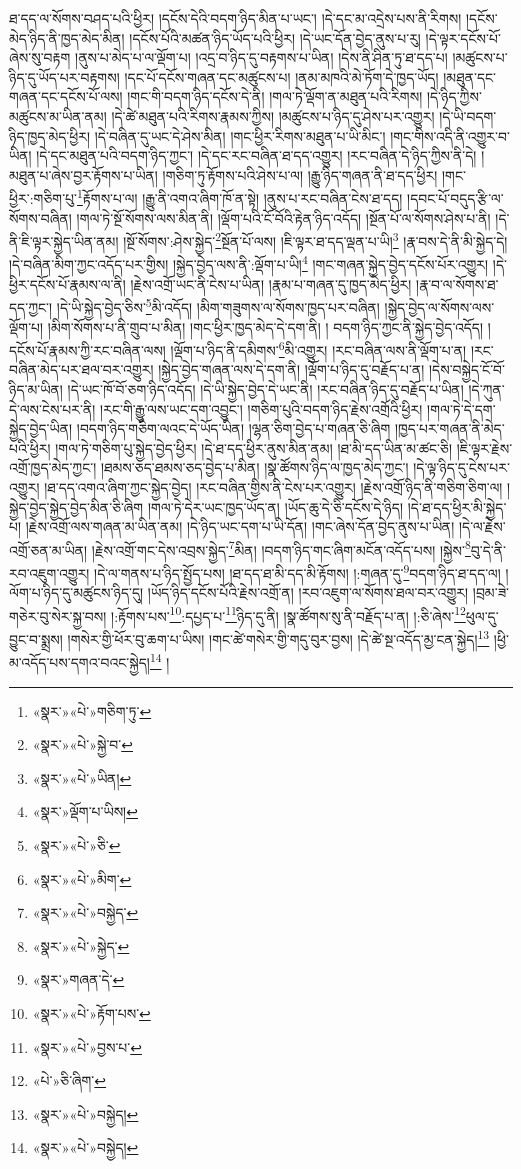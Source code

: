 ཐ་དད་ལ་སོགས་བཤད་པའི་ཕྱིར། །དངོས་དེའི་བདག་ཉིད་མིན་པ་ཡང་། །དེ་དང་མ་འདྲེས་པས་ནི་རིགས། །དངོས་མེད་ཉིད་ནི་ཁྱད་མེད་མིན། །དངོས་པོའི་མཚན་ཉིད་ཡོད་པའི་ཕྱིར། །དེ་ཡང་དོན་བྱེད་ནུས་པ་རུ། །དེ་ལྟར་དངོས་པོ་ཞེས་སུ་བརྟག །ནུས་པ་མེད་པ་ལ་ལྡོག་པ། །འདྲ་བ་ཉིད་དུ་བརྟགས་པ་ཡིན། །དེས་ནི་ཤིན་ཏུ་ཐ་དད་པ། །མཚུངས་པ་ཉིད་དུ་ཡོད་པར་བརྟགས། །དང་པོ་དངོས་གཞན་དང་མཚུངས་པ། །ནམ་མཁའི་མེ་ཏོག་དེ་ཁྱད་ཡོད། །མཐུན་དང་གཞན་དང་དངོས་པོ་ལས། །གང་གི་བདག་ཉིད་དངོས་དེ་ནི། །གལ་ཏེ་ལྡོག་ན་མཐུན་པའི་རིགས། །དེ་ཉིད་ཀྱིས་མཚུངས་མ་ཡིན་ནམ། །དེ་ཚེ་མཐུན་པའི་རིགས་རྣམས་ཀྱིས། །མཚུངས་པ་ཉིད་དུ་ཤེས་པར་འགྱུར། །དེ་ཡི་བདག་ཉིད་ཁྱད་མེད་ཕྱིར། །དེ་བཞིན་དུ་ཡང་དེ་ཤེས་མིན། །གང་ཕྱིར་རིགས་མཐུན་པ་ཡི་མིང་། །གང་གིས་འདི་ནི་འགྱུར་བ་ཡིན། །དེ་དང་མཐུན་པའི་བདག་ཉིད་ཀྱང་། །དེ་དང་རང་བཞིན་ཐ་དད་འགྱུར། །རང་བཞིན་དེ་ཉིད་ཀྱིས་ནི་དེ། །མཐུན་པ་ཞེས་བྱར་རྟོགས་པ་ཡིན། །གཅིག་ཏུ་རྟོགས་པའི་ཤེས་པ་ལ། །རྒྱུ་ཉིད་གཞན་ནི་ཐ་དད་ཕྱིར། །གང་ཕྱིར་:གཅིག་པུ་\footnote{«སྣར་»«པེ་»གཅིག་ཏུ་}རྟོགས་པ་ལ། །རྒྱུ་ནི་འགའ་ཞིག་ཁོ་ན་སྟེ། །ནུས་པ་རང་བཞིན་ངེས་ཐ་དད། །དབང་པོ་བདུད་རྩི་ལ་སོགས་བཞིན། །གལ་ཏེ་སྔོ་སོགས་ལས་མིན་ནི། །ལྡོག་པའི་ངོ་བོའི་རྟེན་ཉིད་འདོད། །སྔོན་པོ་ལ་སོགས་ཤེས་པ་ནི། །དེ་ནི་ཇི་ལྟར་སྐྱེད་ཡིན་ནམ། །སྔོ་སོགས་:ཤེས་སྐྱེད་\footnote{«སྣར་»«པེ་»སྐྱེ་བ་}སྔོན་པོ་ལས། །ཇི་ལྟར་ཐ་དད་ལྡན་པ་ཡི།\footnote{«སྣར་»«པེ་»ཡིན།} །རྣ་བས་དེ་ནི་མི་སྐྱེད་དེ། །དེ་བཞིན་མིག་ཀྱང་འདོད་པར་གྱིས། །སྐྱེད་བྱེད་ལས་ནི་:ལྡོག་པ་ཡི།\footnote{«སྣར་»ལྡོག་པ་ཡིས།} །གང་གཞན་སྐྱེད་བྱེད་དངོས་པོར་འགྱུར། །དེ་ཕྱིར་དངོས་པོ་རྣམས་ལ་ནི། །རྗེས་འགྲོ་ཡང་ནི་ངེས་པ་ཡིན། །རྣམ་པ་གཞན་དུ་ཁྱད་མེད་ཕྱིར། །རྣ་བ་ལ་སོགས་ཐ་དད་ཀྱང་། །དེ་ཡི་སྐྱེད་བྱེད་ཅིས་\footnote{«སྣར་»«པེ་»ཅི་}མི་འདོད། །མིག་གཟུགས་ལ་སོགས་ཁྱད་པར་བཞིན། །སྐྱེད་བྱེད་ལ་སོགས་ལས་ལྡོག་པ། །མིག་སོགས་པ་ནི་གྲུབ་པ་མིན། །གང་ཕྱིར་ཁྱད་མེད་དེ་དག་ནི། །
བདག་ཉིད་ཀྱང་ནི་སྐྱེད་བྱེད་འདོད། །དངོས་པོ་རྣམས་ཀྱི་རང་བཞིན་ལས། །ལྡོག་པ་ཉིད་ནི་དམིགས་\footnote{«སྣར་»«པེ་»མིག་}མི་འགྱུར། །རང་བཞིན་ལས་ནི་ལྡོག་པ་ན། །རང་བཞིན་མེད་པར་ཐལ་བར་འགྱུར། །སྐྱེད་བྱེད་གཞན་ལས་དེ་དག་ནི། །ལྡོག་པ་ཉིད་དུ་བརྗོད་པ་ན། །དེས་བསྐྱེད་ངོ་བོ་ཉིད་མ་ཡིན། །དེ་ཡང་ཁོ་བོ་ཅག་ཉིད་འདོད། །དེ་ཡི་སྐྱེད་བྱེད་དེ་ཡང་ནི། །རང་བཞིན་ཉིད་དུ་བརྗོད་པ་ཡིན། །དེ་ཀུན་དེ་ལས་ངེས་པར་ནི། །རང་གི་རྒྱུ་ལས་ཡང་དག་འབྱུང་། །གཅིག་པུའི་བདག་ཉིད་རྗེས་འགྲོའི་ཕྱིར། །གལ་ཏེ་དེ་དག་སྐྱེད་བྱེད་ཡིན། །བདག་ཉིད་གཅིག་ལའང་དེ་ཡོད་ཡིན། །ལྷན་ཅིག་བྱེད་པ་གཞན་ཅི་ཞིག །ཁྱད་པར་གཞན་ནི་མེད་པའི་ཕྱིར། །གལ་ཏེ་གཅིག་པུ་སྐྱེད་བྱེད་ཕྱིར། །དེ་ཐ་དད་ཕྱིར་ནུས་མིན་ནམ། །ཐ་མི་དད་ཡིན་མ་ཚང་ཅི། །ཇི་ལྟར་རྗེས་འགྲོ་ཁྱད་མེད་ཀྱང་། །ཐམས་ཅད་ཐམས་ཅད་བྱེད་པ་མིན། །སྣ་ཚོགས་ཉིད་ལ་ཁྱད་མེད་ཀྱང་། །དེ་ལྟ་ཉིད་དུ་ངེས་པར་འགྱུར། །ཐ་དད་འགའ་ཞིག་ཀྱང་སྐྱེད་བྱེད། །རང་བཞིན་གྱིས་ནི་ངེས་པར་འགྱུར། །རྗེས་འགྲོ་ཉིད་ནི་གཅིག་ཅིག་ལ། །སྐྱེད་བྱེད་སྐྱེད་བྱེད་མིན་ཅི་ཞིག །གལ་ཏེ་དེར་ཡང་ཁྱད་ཡོད་ན། །ཡོད་ཆུ་དེ་ཅི་དངོས་དེ་ཉིད། །དེ་ཐ་དད་ཕྱིར་མི་སྐྱེད་པ། །རྗེས་འགྲོ་ལས་གཞན་མ་ཡིན་ནམ། །དེ་ཉིད་ཡང་དག་པ་ཡི་དོན། །གང་ཞེས་དོན་བྱེད་ནུས་པ་ཡིན། །དེ་ལ་རྗེས་འགྲོ་ཅན་མ་ཡིན། །རྗེས་འགྲོ་གང་དེས་འབྲས་སྐྱེད་\footnote{«སྣར་»«པེ་»བསྐྱེད་}མིན། །བདག་ཉིད་གང་ཞིག་མངོན་འདོད་པས། །སྐྱེས་\footnote{«སྣར་»«པེ་»སྐྱེད་}བུ་དེ་ནི་རབ་འཇུག་འགྱུར། །དེ་ལ་གནས་པ་ཉིད་སྤྱོད་པས། །ཐ་དད་ཐ་མི་དད་མི་རྟོགས། །:གཞན་དུ་\footnote{«སྣར་»གཞན་དེ་}བདག་ཉིད་ཐ་དད་ལ། །ལོག་པ་ཉིད་དུ་མཚུངས་ཉིད་དུ། །ཡོད་ཉིད་དངོས་པོའི་རྗེས་འགྲོ་ན། །རབ་འཇུག་ལ་སོགས་ཐལ་བར་འགྱུར། །བྲམ་ཟེ་གཅེར་བུ་སེར་སྐྱ་བས། །:རྟོགས་པས་\footnote{«སྣར་»«པེ་»རྟོག་པས་}:དཔྱད་པ་\footnote{«སྣར་»«པེ་»བྱས་པ་}ཉིད་དུ་ནི། །སྣ་ཚོགས་སུ་ནི་བརྗོད་པ་ན། །:ཅི་ཞེས་\footnote{«པེ་»ཅི་ཞིག་}ཕུལ་དུ་བྱུང་བ་སྨྲས། །གསེར་གྱི་ཕོར་བུ་ཆག་པ་ཡིས། །གང་ཚེ་གསེར་གྱི་གདུ་བུར་བྱས། །དེ་ཚེ་སྔ་འདོད་མྱ་ངན་སྐྱེད།\footnote{«སྣར་»«པེ་»བསྐྱེད།} །ཕྱི་མ་འདོད་པས་དགའ་བའང་སྐྱེད།\footnote{«སྣར་»«པེ་»བསྐྱེད།} །
